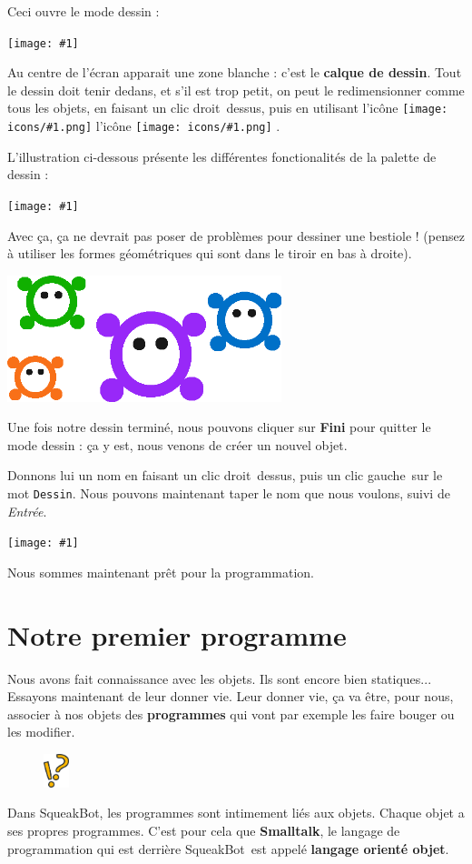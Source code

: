 \documentclass[a4paper,12pt]{book}
\def\appName{SqueakBot}
\def\cd{clic droit~}
\def\cg{clic gauche~}
\newcommand{\capture}[1]
{
\begin{center}
	\texttt{[image: \#1]}
\end{center}
}
\newcommand{\important}[1]{\textbf{#1}}
\newcommand{\inserticon}[1]
{
\texttt{[image: icons/\#1.png]}
}
\newcommand{\icon}[2][]
{
\ifthenelse {\equal{#1} {}} {\inserticon{#2}} {l'icône \inserticon{#2} \important{#1}}
}
\newcommand{\afaire}[1]
{
#1
}
\newcommand{\astuce}[1]
{
\begin{framed}
\begin{figure}
	\vspace{-15pt}
	\includegraphics[width=2.0em]{astuce.png}
\end{figure}
#1
\end{framed}
}
\let\myMargin\marginpar
\renewcommand{\marginpar}[1]{\myMargin{{\scriptsize \sffamily #1}}}
\begin{document}
Ceci ouvre le mode dessin :

\capture{5.png}

Au centre de l'écran apparait une zone blanche : c'est le \important{calque de dessin}. Tout le dessin doit tenir dedans, et s'il est trop petit, on peut le redimensionner comme tous les objets, en faisant un \cd dessus, puis en utilisant l'icône \icon{redimensionner}.

L'illustration ci-dessous présente les différentes fonctionalités de la palette de dessin :

\capture{6.png}

\afaire{
Avec ça, ça ne devrait pas poser de problèmes pour dessiner une bestiole ! (pensez à utiliser les formes géométriques qui sont dans le tiroir en bas à droite).
}

\begin{center}
    \includegraphics[width=8cm]{bestioles.png}
\end{center}

\afaire{
Une fois notre dessin terminé, nous pouvons cliquer sur \textbf{Fini} pour quitter le mode dessin : ça y est, nous venons de créer un nouvel objet.

Donnons lui un nom en faisant un \cd dessus, puis un \cg sur le mot \texttt{Dessin}. Nous pouvons maintenant taper le nom que nous voulons, suivi de \textit{Entrée}.
}

\capture{7.png}

Nous sommes maintenant prêt pour la programmation.

\section{Notre premier programme}
\label{premier_programme}

Nous avons fait connaissance avec les objets. Ils sont encore bien statiques... Essayons maintenant de leur donner vie. Leur donner vie, ça va être, pour nous, associer à nos objets des \important{programmes} qui vont par exemple les faire bouger ou les modifier.\astuce{Dans \appName, les programmes sont intimement liés aux objets. Chaque objet a ses propres programmes. C'est pour cela que \important{Smalltalk}, le langage de programmation qui est derrière \appName~est appelé \important{langage orienté objet}.}
\end{document}

